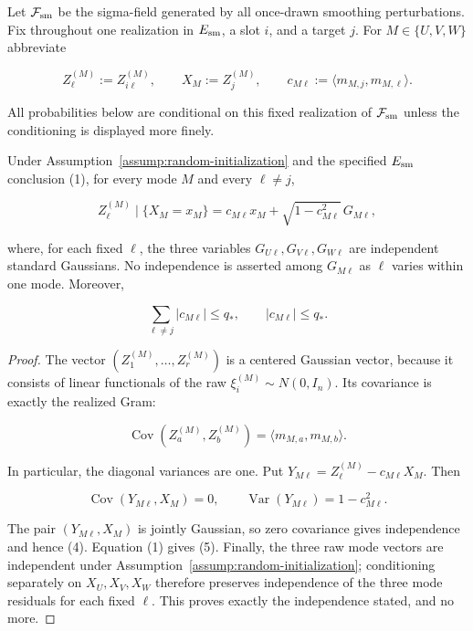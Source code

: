 Let $\mathcal F_{\rm sm}$ be the sigma-field generated by all once-drawn
smoothing perturbations. Fix throughout one realization in $E_{\rm sm}$, a
slot $i$, and a target $j$. For $M\in\{U,V,W\}$ abbreviate

\[
Z_{\ell}^{(M)}:=Z_{i\ell}^{(M)},\qquad
X_M:=Z_j^{(M)},\qquad
c_{M\ell}:=\langle m_{M,j},m_{M,\ell}\rangle .
\tag{3}
\]

All probabilities below are conditional on this fixed realization of
$\mathcal F_{\rm sm}$ unless the conditioning is displayed more finely.


\begin{lemma}\label{lem:step-002-regression}
Under Assumption~\ref{assump:random-initialization} and the specified $E_{\rm sm}$ conclusion (1), for every mode $M$ and every $\ell\ne j$,

\[
Z_{\ell}^{(M)}\mid\{X_M=x_M\}
=c_{M\ell}x_M+\sqrt{1-c_{M\ell}^2}\,G_{M\ell},
\tag{4}
\]

where, for each fixed $\ell$, the three variables
$G_{U\ell},G_{V\ell},G_{W\ell}$ are independent standard Gaussians. No
independence is asserted among $G_{M\ell}$ as $\ell$ varies within one mode.
Moreover,

\[
\sum_{\ell\ne j}|c_{M\ell}|\le q_*,
\qquad |c_{M\ell}|\le q_*.
\tag{5}
\]

\begin{proof}
The vector $(Z_1^{(M)},\ldots,Z_r^{(M)})$ is a centered Gaussian vector,
because it consists of linear functionals of the raw
$\xi_i^{(M)}\sim N(0,I_n)$. Its covariance is exactly the realized Gram:

\[
\operatorname{Cov}(Z_a^{(M)},Z_b^{(M)})
=\langle m_{M,a},m_{M,b}\rangle .
\tag{6}
\]

In particular, the diagonal variances are one. Put
$Y_{M\ell}=Z_{\ell}^{(M)}-c_{M\ell}X_M$. Then

\[
\operatorname{Cov}(Y_{M\ell},X_M)=0,\qquad
\operatorname{Var}(Y_{M\ell})=1-c_{M\ell}^2.
\tag{7}
\]

The pair $(Y_{M\ell},X_M)$ is jointly Gaussian, so zero covariance gives
independence and hence (4). Equation (1) gives (5). Finally, the three raw
mode vectors are independent under
Assumption~\ref{assump:random-initialization}; conditioning separately on
$X_U,X_V,X_W$ therefore preserves independence of the three mode residuals
for each fixed $\ell$. This proves exactly the independence stated, and no
more. 


\end{proof}
\end{lemma}
